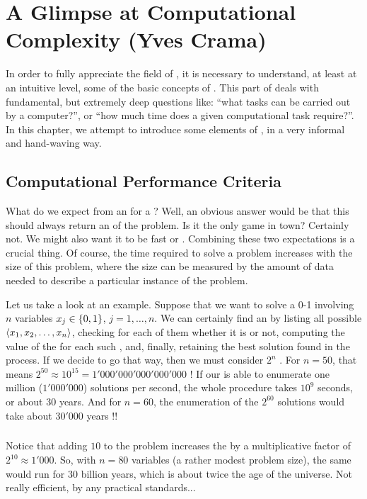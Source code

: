 \chapter{A Glimpse at Computational Complexity (Yves Crama)}
In order to fully appreciate the field of , it is necessary to understand, at least at an intuitive level, some of the basic concepts of . This part of  deals with fundamental, but extremely deep questions like: ``what tasks can be carried out by a computer?'', or ``how much time does a given computational task require?''. In this chapter, we attempt to introduce some elements of , in a very informal and hand-waving way.

\section{Computational Performance Criteria}
What do we expect from an  for a ? Well, an obvious answer would be that this  should always return an  of the problem. Is it the only game in town? Certainly not. We might also want it to be fast or . Combining these two expectations is a crucial thing. Of course, the time required to solve a problem increases with the size of this problem,  where the size can be measured by the amount of data needed to describe a particular instance of the problem.

\begin{example}
Let us take a look at an example. Suppose that we want to solve a 0-1  involving $n$ variables $x_j\in\left\{ 0,1 \right\}$, $j=1,\ldots,n$. We can certainly find an  by listing all possible  $\left\langle x_1,x_2,\ldots,x_n \right\rangle$, checking for each of them whether it is  or not, computing the value of the  for each such , and, finally, retaining the best solution found in the process. If we decide to go that way, then we must consider $2^n$ . For $n=50$, that means $2^{50}\approx 10^{15}=1'000'000'000'000'000$ ! If our  is able to enumerate one million ($1'000'000$) solutions per second, the whole procedure takes $10^9$ seconds, or about $30$ years. And for $n=60$, the enumeration of the $2^{60}$ solutions would take about $30'000$ years !!

\paragraph{}
Notice that adding $10$  to the problem increases the  by a multiplicative factor of $2^{10}\approx1'000$. So, with $n=80$ variables (a rather modest problem size), the same  would run for $30$ billion years, which is about twice the age of the universe. Not really efficient, by any practical standards...
\end{example}

